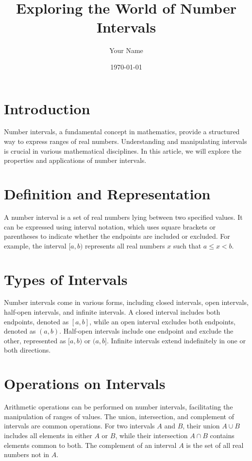 \documentclass{article}
\title{Exploring the World of Number Intervals}
\author{Your Name}
\date{\today}
\begin{document}
\maketitle

\section{Introduction}
Number intervals, a fundamental concept in mathematics, provide a structured way to express ranges of real numbers. Understanding and manipulating intervals is crucial in various mathematical disciplines. In this article, we will explore the properties and applications of number intervals.

\section{Definition and Representation}
A number interval is a set of real numbers lying between two specified values. It can be expressed using interval notation, which uses square brackets or parentheses to indicate whether the endpoints are included or excluded. For example, the interval $[a, b)$ represents all real numbers $x$ such that $a \leq x < b$.

\section{Types of Intervals}
Number intervals come in various forms, including closed intervals, open intervals, half-open intervals, and infinite intervals. A closed interval includes both endpoints, denoted as $[a, b]$, while an open interval excludes both endpoints, denoted as $(a, b)$. Half-open intervals include one endpoint and exclude the other, represented as $[a, b)$ or $(a, b]$. Infinite intervals extend indefinitely in one or both directions.

\section{Operations on Intervals}
Arithmetic operations can be performed on number intervals, facilitating the manipulation of ranges of values. The union, intersection, and complement of intervals are common operations. For two intervals $A$ and $B$, their union $A \cup B$ includes all elements in either $A$ or $B$, while their intersection $A \cap B$ contains elements common to both. The complement of an interval $A$ is the set of all real numbers not in $A$.
\end{document}

